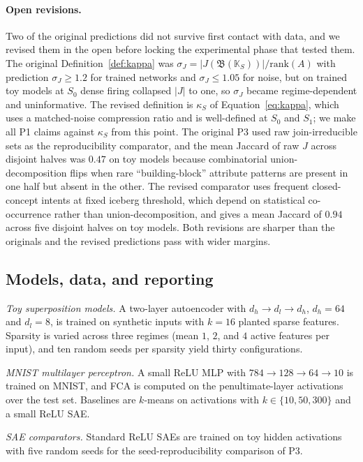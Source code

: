 \documentclass[a4paper,fleqn]{cas-dc}
\newcommand{\K}{\mathbb{K}}
\newcommand{\Lat}{\mathfrak{B}}
\newcommand{\Jirr}{J}
\newcommand{\kS}{\kappa_S}
\begin{document}
\paragraph{Open revisions.}
Two of the original predictions did not survive first contact with data, and we revised them in the open before locking the experimental phase that tested them.
The original Definition~\ref{def:kappa} was $\sigma_J = |\Jirr(\Lat(\K_S))| / \mathrm{rank}(A)$ with prediction $\sigma_J \ge 1.2$ for trained networks and $\sigma_J \le 1.05$ for noise, but on trained toy models at $S_0$ dense firing collapsed $|\Jirr|$ to one, so $\sigma_J$ became regime-dependent and uninformative.
The revised definition is $\kS$ of Equation~\eqref{eq:kappa}, which uses a matched-noise compression ratio and is well-defined at $S_0$ and $S_1$; we make all P1 claims against $\kS$ from this point.
The original P3 used raw join-irreducible sets as the reproducibility comparator, and the mean Jaccard of raw $\Jirr$ across disjoint halves was $0.47$ on toy models because combinatorial union-decomposition flips when rare ``building-block'' attribute patterns are present in one half but absent in the other.
The revised comparator uses frequent closed-concept intents at fixed iceberg threshold, which depend on statistical co-occurrence rather than union-decomposition, and gives a mean Jaccard of $0.94$ across five disjoint halves on toy models.
Both revisions are sharper than the originals and the revised predictions pass with wider margins.

\subsection{Models, data, and reporting}\label{ssec:models}

\emph{Toy superposition models.}
A two-layer autoencoder with $d_h \to d_l \to d_h$, $d_h = 64$ and $d_l = 8$, is trained on synthetic inputs with $k = 16$ planted sparse features.
Sparsity is varied across three regimes (mean $1$, $2$, and $4$ active features per input), and ten random seeds per sparsity yield thirty configurations.

\emph{MNIST multilayer perceptron.}
A small ReLU MLP with $784 \to 128 \to 64 \to 10$ is trained on MNIST, and FCA is computed on the penultimate-layer activations over the test set.
Baselines are $k$-means on activations with $k \in \{10, 50, 300\}$ and a small ReLU SAE.

\emph{SAE comparators.}
Standard ReLU SAEs are trained on toy hidden activations with five random seeds for the seed-reproducibility comparison of P3.
\end{document}
